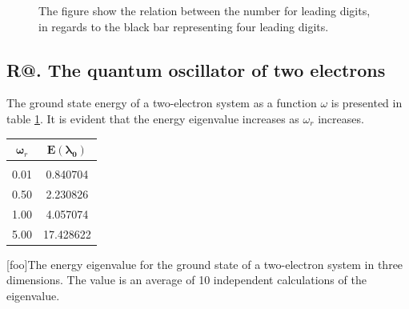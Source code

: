 \documentclass[%
reprint,
amsmath,amssymb,
aps,
]{revtex4-1}
\makeatletter
\newcommand*{\rom}[1]{\expandafter\@slowromancap\romannumeral #1@}
\makeatother
\begin{document}
\begin{figure}[!h]
	\noindent{}
	\caption{The figure show the relation between the number for leading digits, in regards to the black bar representing four leading digits.} \label{fig:RE}
\end{figure}
 
\subsection*{R\rom{3}. The quantum oscillator of two electrons} \noindent 
The ground state energy of a two-electron system as a function $\omega$ is presented in table \ref{tab2}. It is evident that the energy eigenvalue increases as $\omega_r$ increases. 

\begin{table}[H]
	\centering 
	\begin{tabular} {|c|c|}
		\hline
		$\mathbf{\omega}_r$ & $\mathbf{E(\lambda_0)}$\\ 
		\hline
		& \\ 
0.01 &  0.840704 \\
0.50 &  2.230826\\
1.00 &  4.057074\\
5.00 &  17.428622\\ 
\hline 
	\end{tabular}
	[foo]{The energy eigenvalue for the ground state of a two-electron system in three dimensions. The value is an average of 10 independent calculations of the eigenvalue.\label{tab2}}
\end{table}
\end{document}
